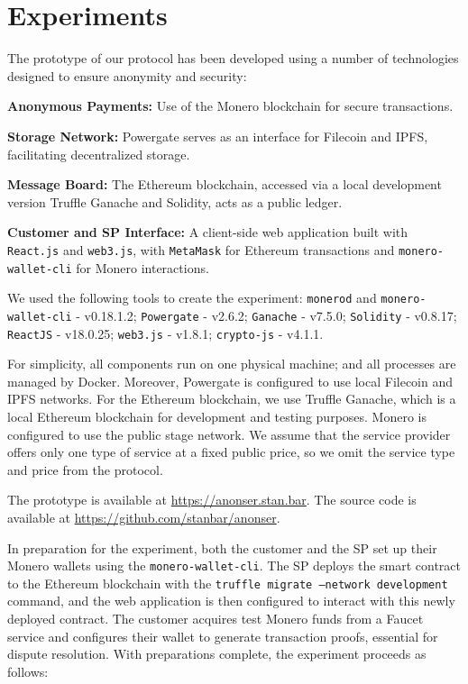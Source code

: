 \documentclass[pdftex,twocolumn,epjc3]{svjour3}
\begin{document}
\section{Experiments}\label{sec:experiments}

The prototype of our protocol has been developed using a number of technologies designed to ensure anonymity and security:
\begin{itemize}
\begin{sloppypar}
  \item \textbf{Anonymous Payments:} Use of the Monero blockchain for secure transactions.
\end{sloppypar}
  \item \textbf{Storage Network:} Powergate serves as an interface for Filecoin and IPFS, facilitating decentralized storage.
  \item \textbf{Message Board:} The Ethereum blockchain, accessed via a local development version Truffle Ganache and Solidity, acts as a public ledger.
  \item \textbf{Customer and SP Interface:} A client-side web application built with \texttt{React.js} and \texttt{web3.js}, with \texttt{MetaMask} for Ethereum transactions and \texttt{monero-wallet-cli} for Monero interactions.
\end{itemize}

We used the following tools to create the experiment:
\texttt{monerod} and \texttt{monero-wallet-cli} - v0.18.1.2; \texttt{Powergate} - v2.6.2; \texttt{Ganache} - v7.5.0; \texttt{Solidity} - v0.8.17; \texttt{ReactJS} - v18.0.25; \texttt{web3.js} - v1.8.1; \texttt{crypto-js} - v4.1.1.

For simplicity, all components run on one physical machine; and all processes are managed by Docker. 
Moreover, Powergate is configured to use local Filecoin and IPFS networks.
For the Ethereum blockchain, we use Truffle Ganache, which is a local Ethereum blockchain for development and testing purposes. 
Monero is configured to use the public stage network.
We assume that the service provider offers only one type of service at a fixed public price, so we omit the service type and price from the protocol.

The prototype is available at \url{https://anonser.stan.bar}. The source code is available at \url{https://github.com/stanbar/anonser}.

In preparation for the experiment, both the customer and the SP set up their Monero wallets using the \texttt{monero-wallet-cli}. The SP deploys the smart contract to the Ethereum blockchain with the \texttt{truffle migrate --network development} command, and the web application is then configured to interact with this newly deployed contract.
The customer acquires test Monero funds from a Faucet service and configures their wallet to generate transaction proofs, essential for dispute resolution.
With preparations complete, the experiment proceeds as follows:
\end{document}
